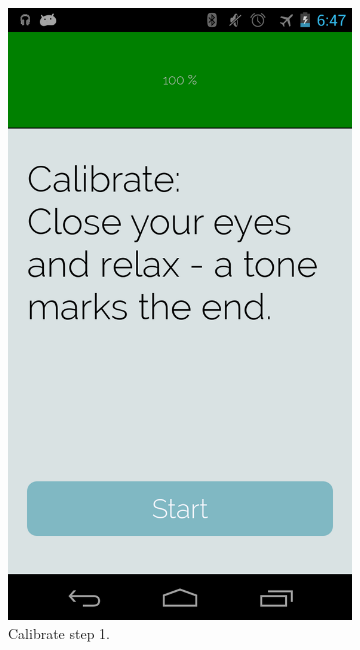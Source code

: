 \documentclass[a4paper,10pt,english,lof,lot,twoside]{puthesis}
\begin{document}
\begin{figure}
\begin{subfigure}[t]{0.30\linewidth}
\includegraphics[width=0.800\linewidth]{final-prototype-calibrate-step-1.png}
\caption[Calibrate step 1]{Calibrate step 1.}\label{ch-design/index:fig-final-prototype-app-flow-calibrate-step-1}\end{subfigure}
\begin{subfigure}[t]{0.30\linewidth}
\centering
\capstart


\end{subfigure}
\end{figure}
\end{document}
